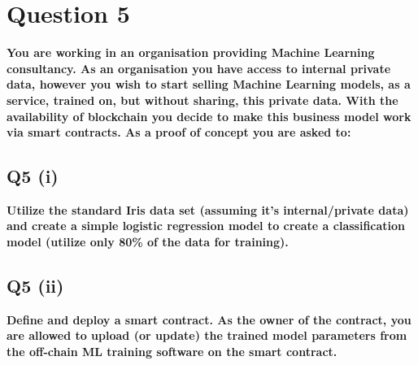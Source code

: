 \section{Question 5}\label{ssec:pt2q5}

\textbf{You are working in an organisation providing Machine Learning consultancy. As an organisation you have access to internal private data, however you wish to start selling Machine Learning models, as a service, trained on, but without sharing, this private data. With the availability of blockchain you decide to make this business model work via smart contracts. As a proof of concept you are asked to:}



\subsection{Q5 (i)}\label{sssec:pt2q5i}
\textbf{Utilize the standard Iris data set (assuming it’s internal/private data) and create a simple logistic regression model to create a classification model (utilize only 80\% of the data for training).}



\subsection{Q5 (ii)}\label{sssec:pt2q5ii}

\textbf{Define and deploy a smart contract. As the owner of the contract, you are allowed to upload (or update) the trained model parameters from the off-chain ML training software on the smart contract. }



